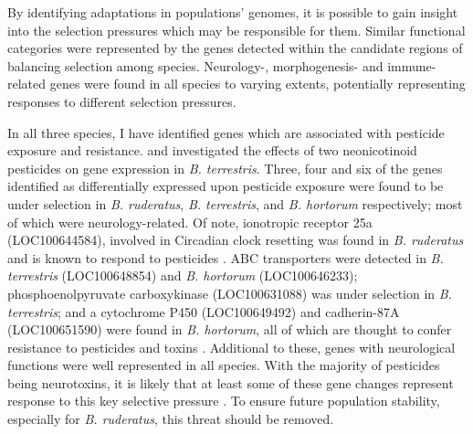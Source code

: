 \documentclass[12pt]{article}
\begin{document}
\begin{linenumbers}
		
	By identifying adaptations in populations' genomes, it is possible to gain insight into the selection pressures which may be responsible for them. Similar functional categories were represented by the genes detected within the candidate regions of balancing selection among species. Neurology-, morphogenesis- and immune-related genes were found in all species to varying extents, potentially representing responses to different selection pressures.
		
	In all three species, I have identified genes which are associated with pesticide exposure and resistance. \cite{bebane_effects_2019} and \cite{colgan_caste-_2019} investigated the effects of two neonicotinoid pesticides on gene expression in \emph{B. terrestris}. Three, four and six of the genes identified as differentially expressed upon pesticide exposure were found to be under selection in \emph{B. ruderatus}, \emph{B. terrestris}, and \emph{B. hortorum} respectively; most of which were neurology-related. Of note, ionotropic receptor 25a (LOC100644584), involved in Circadian clock resetting was found in \emph{B. ruderatus} and is known to respond to pesticides \citep{chen_drosophila_2015}. ABC transporters were detected in \emph{B. terrestris} (LOC100648854) and \emph{B. hortorum} (LOC100646233); phosphoenolpyruvate carboxykinase (LOC100631088) was under selection in \emph{B. terrestris}; and a cytochrome P450 (LOC100649492) and cadherin-87A (LOC100651590) were found in \emph{B. hortorum}, all of which are thought to confer resistance to pesticides and toxins \citep{bebane_effects_2019, colgan_caste-_2019, haas_phylogenomic_2022}.
	Additional to these, genes with neurological functions were well represented in all species. With the majority of pesticides being neurotoxins, it is likely that at least some of these gene changes represent response to this key selective pressure  \citep{siviter_quantifying_2018}. To ensure future population stability, especially for \emph{B. ruderatus}, this threat should be removed.
		


\end{linenumbers}
\end{document}

